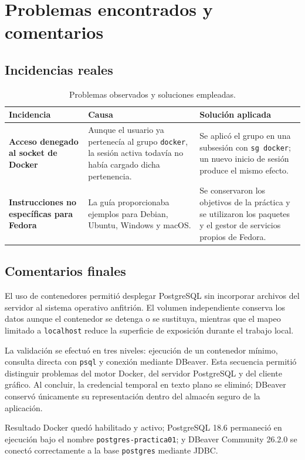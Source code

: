 \section{Problemas encontrados y comentarios}

\subsection{Incidencias reales}

\begin{table}[H]
  \centering
  \begin{tabularx}{\textwidth}{>{\raggedright\arraybackslash\bfseries}p{}XX}
    \toprule
    Incidencia & Causa & Solución aplicada \\
    \midrule
    Acceso denegado al socket de Docker & Aunque el usuario ya pertenecía al
    grupo \texttt{docker}, la sesión activa todavía no había cargado dicha
    pertenencia. & Se aplicó el grupo en una subsesión con \texttt{sg docker};
    un nuevo inicio de sesión produce el mismo efecto. \\
    \addlinespace
    Instrucciones no específicas para Fedora & La guía proporcionaba ejemplos
    para Debian, Ubuntu, Windows y macOS. & Se conservaron los objetivos de la
    práctica y se utilizaron los paquetes y el gestor de servicios propios de
    Fedora. \\
    \bottomrule
  \end{tabularx}
  \caption{Problemas observados y soluciones empleadas.}
\end{table}

\subsection{Comentarios finales}

El uso de contenedores permitió desplegar PostgreSQL sin incorporar archivos
del servidor al sistema operativo anfitrión. El volumen independiente conserva
los datos aunque el contenedor se detenga o se sustituya, mientras que el mapeo
limitado a \texttt{localhost} reduce la superficie de exposición durante el
trabajo local.

La validación se efectuó en tres niveles: ejecución de un contenedor mínimo,
consulta directa con \texttt{psql} y conexión mediante DBeaver. Esta secuencia
permitió distinguir problemas del motor Docker, del servidor PostgreSQL y del
cliente gráfico. Al concluir, la credencial temporal en texto plano se eliminó;
DBeaver conservó únicamente su representación dentro del almacén seguro de la
aplicación.

\begin{nota}{Resultado}
Docker quedó habilitado y activo; PostgreSQL 18.6 permaneció en ejecución bajo
el nombre \texttt{postgres-practica01}; y DBeaver Community 26.2.0 se conectó
correctamente a la base \texttt{postgres} mediante JDBC.
\end{nota}
